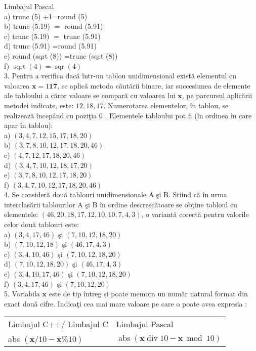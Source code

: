 Limbajul Pascal\\
a) trunc (5) +1=round (5)\\
b) trunc (5.19) $=$ round (5.91)\\
c) trunc (5.19) $=$ trunc (5.91)\\
d) trunc (5.91) =round (5.91)\\
e) round (sqrt (8)) =trunc (sqrt (8))\\
f) $\operatorname{sqrt}(4)=\operatorname{sqr}(4)$\\
3. Pentru a verifica dacă într-un tablou unidimensional există elementul cu valoarea $\mathbf{x}=1 \mathbf{1 7}$, se aplică metoda căutării binare, iar succesiunea de elemente ale tabloului a căror valoare se compară cu valoarea lui $\mathbf{x}$, pe parcursul aplicării metodei indicate, este: $12,18,17$. Numerotarea elementelor, în tablou, se realizează începând cu poziţia 0 . Elementele tabloului pot fi (în ordinea în care apar în tablou):\\
a) $(3,4,7,12,15,17,18,20)$\\
b) $(3,7,8,10,12,17,18,20,46)$\\
c) $(4,7,12,17,18,20,46)$\\
d) $(3,4,7,10,12,18,17,20)$\\
e) $(3,7,8,10,12,17,18,20)$\\
f) $(3,4,7,10,12,17,18,20,46)$\\
4. Se consideră două tablouri unidimensionale A şi B. Știind că în urma interclasării tablourilor A şi B în ordine descrescătoare se obţine tabloul cu elementele: $(46,20,18,17,12,10,10,7,4,3)$, o variantă corectă pentru valorile celor două tablouri este:\\
a) $(3,4,17,46)$ şi $(7,10,12,18,20)$\\
b) $(7,10,12,18)$ şi $(46,17,4,3)$\\
c) $(3,4,10,46)$ şi $(7,10,12,18,20)$\\
d) $(7,10,12,18,20)$ şi $(46,17,4,3)$\\
e) $(3,4,10,17,46)$ şi $(7,10,12,18,20)$\\
f) $(3,4,17,46)$ şi $(7,10,12,20)$\\
5. Variabila $\mathbf{x}$ este de tip întreg și poate memora un număr natural format din exact două cifre. Indicaţi cea mai mare valoare pe care o poate avea expresia :

\begin{center}
\begin{tabular}{l|l}
Limbajul C++/ Limbajul C & Limbajul Pascal \\
abs $(\mathbf{x} / 10-\mathbf{x} \% 10)$ & $\operatorname{abs}(\mathbf{x} \operatorname{div} 10-\mathbf{x} \bmod 10)$ \\
\end{tabular}
\end{center}

